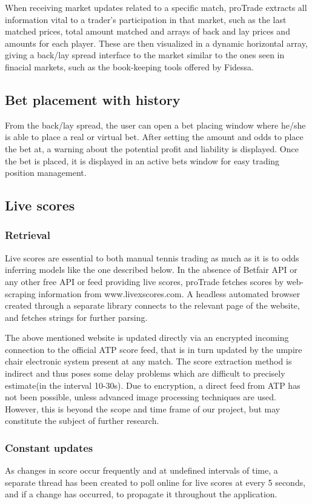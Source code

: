 \documentclass[10pt]{report}
\begin{document}
When receiving market updates related to a specific match, proTrade extracts all information vital to a trader's participation in that market, such as the last matched prices, total amount matched and arrays of back and lay prices and amounts for each player. These are then visualized in a dynamic horizontal array, giving a back/lay spread interface to the market similar to the ones seen in finacial markets, such as the book-keeping tools offered by Fidessa. 

\subsection {Bet placement with history}
From the back/lay spread, the user can open a bet placing window where he/she is able to place a real or virtual bet. After setting the amount and odds to place the bet at, a warning about the potential profit and liability is displayed. Once the bet is placed, it is displayed in an active bets window for easy trading position management.  

\subsection {Live scores}
\subsubsection {Retrieval}
Live scores are essential to both manual tennis trading as much as it is to odds inferring models like the one described below. In the absence of Betfair API or any other free API or feed providing live scores, proTrade fetches scores by web-scraping information from www.livexscores.com. A headless automated browser created through a separate library connects to the relevant page of the website, and fetches strings for further parsing.

The above mentioned website is updated directly via an encrypted incoming connection to the official ATP score feed, that is in turn updated by the umpire chair electronic system present at any match. The score extraction method is indirect and thus poses some delay problems which are difficult to precisely estimate(in the interval 10-30s). Due to encryption, a direct feed from ATP has not been possible, unless advanced image processing techniques are used. However, this is beyond the scope and time frame of our project, but may constitute the subject of further research.

\subsubsection {Constant updates}
As changes in score occur frequently and at undefined intervals of time, a separate thread has been created to poll online for live scores at every 5 seconds, and if a change has occurred, to propagate it throughout the application.
\end{document}
